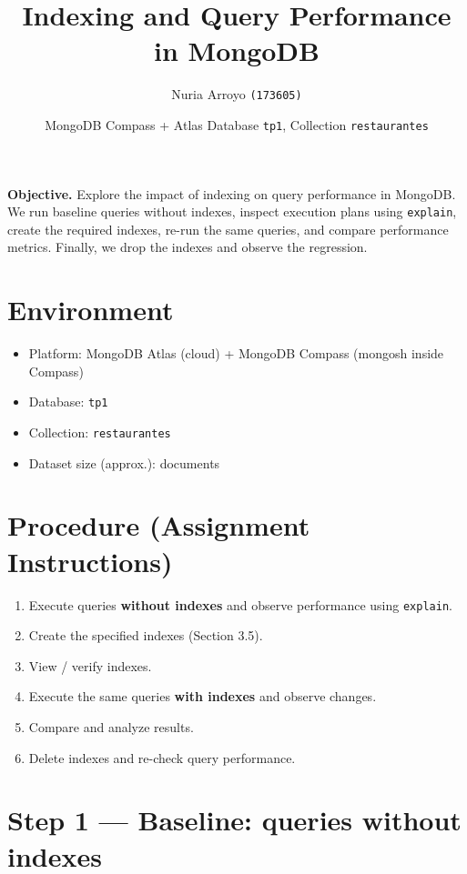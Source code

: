 \documentclass[11pt]{article}
\title{Indexing and Query Performance in MongoDB}
\author{Nuria Arroyo \quad \texttt{(173605)}}
\date{MongoDB Compass + Atlas \; \textbullet \; Database \texttt{tp1}, Collection \texttt{restaurantes}}
\begin{document}
\maketitle

\begin{tcolorbox}
\textbf{Objective.} Explore the impact of indexing on query performance in MongoDB. We run baseline queries without indexes, inspect execution plans using \texttt{explain}, create the required indexes, re-run the same queries, and compare performance metrics. Finally, we drop the indexes and observe the regression.
\end{tcolorbox}

\section{Environment}
\begin{itemize}
  \item Platform: MongoDB Atlas (cloud) + MongoDB Compass (mongosh inside Compass)
  \item Database: \texttt{tp1}
  \item Collection: \texttt{restaurantes}
  \item Dataset size (approx.): \underline{\hspace{3cm}} documents
\end{itemize}

\section{Procedure (Assignment Instructions)}
\begin{enumerate}
  \item Execute queries \textbf{without indexes} and observe performance using \texttt{explain}.
  \item Create the specified indexes (Section 3.5).
  \item View / verify indexes.
  \item Execute the same queries \textbf{with indexes} and observe changes.
  \item Compare and analyze results.
  \item Delete indexes and re-check query performance.
\end{enumerate}
\newpage

\section{Step 1 — Baseline: queries without indexes}
\end{document}
